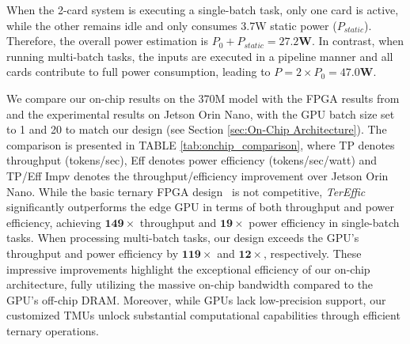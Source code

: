 When the 2-card system is executing a single-batch task, only one card is active, while the other remains idle and only consumes 3.7W static power ($P_{static}$). Therefore, the overall power estimation is $P_0+P_{static}=\mathbf{27.2W}$. In contrast, when running multi-batch tasks, the inputs are executed in a pipeline manner and all cards contribute to full power consumption, leading to $P=2\times P_0=\mathbf{47.0W}$. 

\begin{table}[h]
    \vspace{-1mm}
    \centering
    \caption{Comparison of \textit{TerEffic} (On-Chip) with GPU and a simplistic FPGA design\cite{scalable} for a 370M model.}
    \label{tab:onchip_comparison} 
    \vspace{-3mm}
\end{table} 
We compare our on-chip results on the 370M model with the FPGA results from \cite{scalable} and the experimental results on Jetson Orin Nano, with the GPU batch size set to 1 and 20 to match our design (see Section \ref{sec:On-Chip Architecture}). The comparison is presented in TABLE \ref{tab:onchip_comparison}, where TP denotes throughput (tokens/sec), Eff denotes power efficiency (tokens/sec/watt) and TP/Eff Impv denotes the throughput/efficiency improvement over Jetson Orin Nano. While the basic ternary FPGA design~\cite{scalable} is not competitive, \textit{TerEffic} significantly outperforms the edge GPU in terms of both throughput and power efficiency, achieving $\mathbf{149\times}$ throughput and $\mathbf{19\times}$ power efficiency in single-batch tasks. When processing multi-batch tasks, our design exceeds the GPU's throughput and power efficiency by $\mathbf{119\times}$ and $\mathbf{12\times}$, respectively. These impressive improvements highlight the exceptional efficiency of our on-chip architecture, fully utilizing the massive on-chip bandwidth compared to the GPU's off-chip DRAM. Moreover, while GPUs lack low-precision support, our customized TMUs unlock substantial computational capabilities through efficient ternary operations.
 



